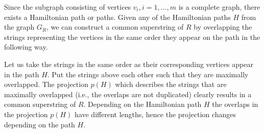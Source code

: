 \documentclass[english,twoside,censored,csm,algorithms-track-2020]{HYthesisML}
\theoremstyle{plain}
\theoremstyle{definition}
\numberwithin{testexample}{chapter}
\begin{document}

Since the subgraph consisting of vertices $v_i, i=1,...,m$ is a complete graph, there exists a
Hamiltonian path or paths. Given any
of the Hamiltonian paths $H$ from the graph $G_R$, we can construct a common superstring of $R$ by
overlapping the strings representing the vertices in the same order they appear on the path in the
following way.

Let us take the strings in the same order as their corresponding vertices appear in the path $H$. Put the
strings above each other such that they are maximally overlapped. The projection $p(H)$ which describes
the strings that are maximally overlapped (i.e., the overlaps are not duplicated) clearly results in a
common superstring of $R$. Depending on the Hamiltonian path $H$ the overlaps in the
projection $p(H)$ have different lengths, hence the projection changes depending on the path $H$. 
\end{document}
